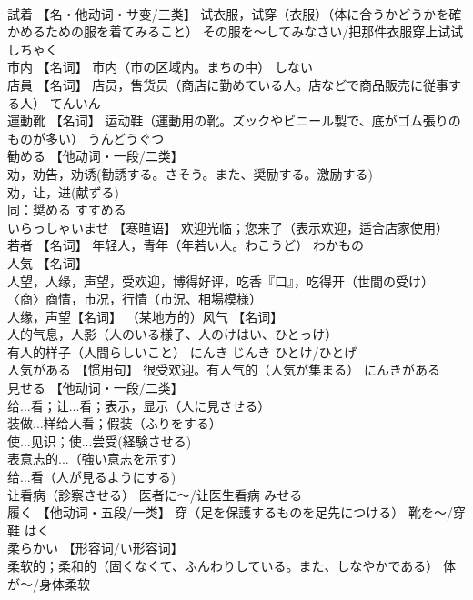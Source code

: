 \documentclass[8pt]{extreport}
\begin{document}
\begin{CJK}{UTF8}{min}
\\	試着	【名・他动词・サ变/三类】 试衣服，试穿（衣服）（体に合うかどうかを確かめるための服を着てみること） その服を〜してみなさい/把那件衣服穿上试试	しちゃく	
\\	市内	【名词】 市内（市の区域内。まちの中）	しない	
\\	店員	【名词】 店员，售货员（商店に勤めている人。店などで商品販売に従事する人）	てんいん	
\\	運動靴	【名词】 运动鞋（運動用の靴。ズックやビニール製で、底がゴム張りのものが多い）	うんどうぐつ	
\\	勧める	【他动词・一段/二类】 
\\	劝，劝告，劝诱(勧誘する。さそう。また、奨励する。激励する) 
\\	劝，让，进(献ずる) 
\\	同：奨める	すすめる	
\\	いらっしゃいませ	【寒暄语】 欢迎光临；您来了（表示欢迎，适合店家使用）		
\\	若者	【名词】 年轻人，青年（年若い人。わこうど）	わかもの	
\\	人気	【名词】 
\\	人望，人缘，声望，受欢迎，博得好评，吃香『口』，吃得开（世間の受け） 
\\	〈商〉商情，市况，行情（市況、相場模様） 
\\	人缘，声望【名词】 （某地方的）风气 【名词】 
\\	人的气息，人影（人のいる様子、人のけはい、ひとっけ） 
\\	有人的样子（人間らしいこと）	にんき じんき ひとけ/ひとげ	
\\	人気がある	【惯用句】 很受欢迎。有人气的（人気が集まる）	にんきがある	
\\	見せる	【他动词・一段/二类】 
\\	给...看；让...看；表示，显示（人に見させる） 
\\	装做...样给人看；假装（ふりをする） 
\\	使...见识；使...尝受(経験させる) 
\\	表意志的...（強い意志を示す） 
\\	给...看（人が見るようにする) 
\\	让看病（診察させる） 医者に〜/让医生看病	みせる	
\\	履く	【他动词・五段/一类】 穿（足を保護するものを足先につける） 靴を〜/穿鞋	はく	
\\	柔らかい	【形容词/い形容词】 
\\	柔软的；柔和的（固くなくて、ふんわりしている。また、しなやかである） 体が～/身体柔软 

\end{CJK}
\end{document}
